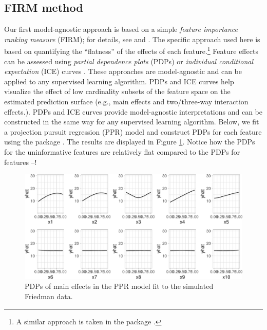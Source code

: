 \subsection{FIRM method}

Our first model-agnostic approach is based on a simple \emph{feature
importance ranking measure} (FIRM); for details, see
\citet{greenwell-simple-2018} and \citet{firm}. The specific approach
used here is based on quantifying the ``flatness'' of the effects of
each feature.\footnote{A similar approach is taken in the 
  package \citep{R-vivo}.} Feature effects can be assessed using
\emph{partial dependence plots} (PDPs) \citep{friedman-2001-greedy} or
\emph{individual conditional expectation} (ICE) curves
\citep{goldstein-peeking-2015}. These approaches are model-agnostic and
can be applied to any supervised learning algorithm. PDPs and ICE curves
help visualize the effect of low cardinality subsets of the feature
space on the estimated prediction surface (e.g., main effects and
two/three-way interaction effects.). PDPs and ICE curves provide
model-agnostic interpretations and can be constructed in the same way
for any supervised learning algorithm. Below, we fit a projection
pursuit regression (PPR) model and construct PDPs for each feature using
the  package \citet{pdp2017}. The results are displayed in
Figure \ref{fig:pdp-ppr}. Notice how the PDPs for the uninformative
features are relatively flat compared to the PDPs for features
--!

\begin{Schunk}
\begin{figure}[!htb]

{\centering \includegraphics[width=1\linewidth]{greenwell-boehmke_files/figure-latex/pdp-ppr-1} 

}

\caption[PDPs of main effects in the PPR model fit to the simulated Friedman data]{PDPs of main effects in the PPR model fit to the simulated Friedman data.}\label{fig:pdp-ppr}
\end{figure}
\end{Schunk}

